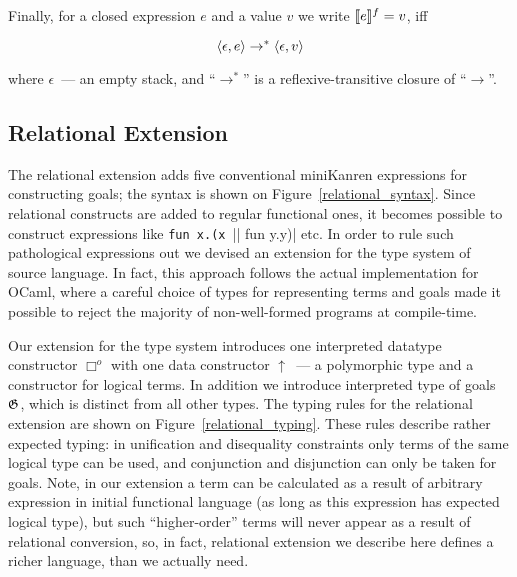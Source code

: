 Finally, for a closed expression $e$ and a value $v$ we write $\llbracket{e}\rrbracket^f=v$, iff 

$$\left<{\epsilon,e}\right>\to^*\left<{\epsilon,v}\right>$$

\noindent where $\epsilon$~--- an empty stack, and ``$\to^*$'' is a reflexive-transitive closure of ``$\to$''.

\subsection{Relational Extension}
\label{relational_extension}

The relational extension adds five conventional miniKanren expressions for constructing goals; the syntax is shown on Figure~\ref{relational_syntax}.
Since relational constructs are added to regular functional ones, it becomes possible to construct expressions like \lstinline|fun x.(x ||| fun y.y)| etc.
In order to rule such pathological expressions out we devised an extension for the type system of source language. In fact, this approach follows the
actual implementation for OCaml, where a careful choice of types for representing terms and goals made it possible to reject the majority of non-well-formed
programs at compile-time.



Our extension for the type system introduces one interpreted datatype constructor $\Box^o$ with one data constructor $\uparrow$~--- a polymorphic type and
a constructor for logical terms. In addition we introduce interpreted type of goals $\mathfrak G$, which is distinct from all other types. The typing rules for the relational 
extension are shown on Figure~\ref{relational_typing}. These rules describe rather expected typing: in unification and disequality constraints only
terms of the same logical type can be used, and conjunction and disjunction can only be taken for goals. Note, in our extension a term can be calculated as
a result of arbitrary expression in initial functional language (as long as this expression has expected logical type), but such ``higher-order'' terms will
never appear as a result of relational conversion, so, in fact, relational extension we describe here defines a richer language, than we actually need.

